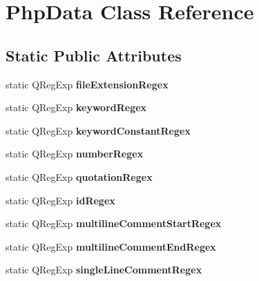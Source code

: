 \hypertarget{class_php_data}{
\section{PhpData Class Reference}
\label{class_php_data}
}
\subsection*{Static Public Attributes}
\begin{DoxyCompactItemize}
\item 
\hypertarget{class_php_data_ace09b0ce178b2144186a200063093d0b}{
static QRegExp {\bfseries fileExtensionRegex}}
\label{class_php_data_ace09b0ce178b2144186a200063093d0b}

\item 
\hypertarget{class_php_data_a2cd27801d611303c838f22b9aaf4f878}{
static QRegExp {\bfseries keywordRegex}}
\label{class_php_data_a2cd27801d611303c838f22b9aaf4f878}

\item 
\hypertarget{class_php_data_a2b2ee5ab3655aacad6a4688df2214aca}{
static QRegExp {\bfseries keywordConstantRegex}}
\label{class_php_data_a2b2ee5ab3655aacad6a4688df2214aca}

\item 
\hypertarget{class_php_data_a06f602ac55674706a4c0cd36ab5f5083}{
static QRegExp {\bfseries numberRegex}}
\label{class_php_data_a06f602ac55674706a4c0cd36ab5f5083}

\item 
\hypertarget{class_php_data_a82410315372a973fad003081b5a40018}{
static QRegExp {\bfseries quotationRegex}}
\label{class_php_data_a82410315372a973fad003081b5a40018}

\item 
\hypertarget{class_php_data_a0fa0a222529670a4ad5ae45218a4a9b7}{
static QRegExp {\bfseries idRegex}}
\label{class_php_data_a0fa0a222529670a4ad5ae45218a4a9b7}

\item 
\hypertarget{class_php_data_ae62639d8df92ad1218e739003424f431}{
static QRegExp {\bfseries multilineCommentStartRegex}}
\label{class_php_data_ae62639d8df92ad1218e739003424f431}

\item 
\hypertarget{class_php_data_ae03d03b3250bfcd28d30aae2ff357114}{
static QRegExp {\bfseries multilineCommentEndRegex}}
\label{class_php_data_ae03d03b3250bfcd28d30aae2ff357114}

\item 
\hypertarget{class_php_data_a1af4b999b176b0d657bd291a135ab6ff}{
static QRegExp {\bfseries singleLineCommentRegex}}
\label{class_php_data_a1af4b999b176b0d657bd291a135ab6ff}


\end{DoxyCompactItemize}
